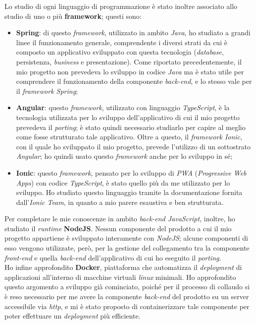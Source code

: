 Lo studio di ogni linguaggio di programmazione è stato inoltre associato allo studio di uno o più \textbf{framework}; questi sono:
\begin{itemize}
  \item \textbf{Spring}: di questo \textit{framework}, utilizzato in ambito \textit{Java}, ho studiato a grandi linee il funzionamento generale, comprendente i diversi strati da cui è composto un applicativo sviluppato con questa tecnologia (\textit{database}, persistenza, \textit{business} e presentazione). Come riportato precedentemente, il mio progetto non prevedeva lo sviluppo in codice \textit{Java} ma è stato utile per comprendere il funzionamento della componente \textit{back-end}, e lo stesso vale per il \textit{framework Spring};
  \item \textbf{Angular}: questo \textit{framework}, utilizzato con linguaggio \textit{TypeScript}, è la tecnologia utilizzata per lo sviluppo dell'applicativo di cui il mio progetto prevedeva il \textit{porting}; è stato quindi necessario studiarlo per capire al meglio come fosse strutturato tale applicativo. Oltre a questo, il \textit{framework Ionic}, con il quale ho sviluppato il mio progetto, prevede l'utilizzo di un sottostrato \textit{Angular}; ho quindi usato questo \textit{framework} anche per lo sviluppo in sé;
  \item \textbf{Ionic}: questo \textit{framework}, pensato per lo sviluppo di \textit{PWA} (\textit{Progressive Web Apps}) con codice \textit{TypeScript}, è stato quello più da me utilizzato per lo sviluppo. Ho studiato questo linguaggio tramite la documentazione fornita dall'\textit{Ionic Team}, in quanto a mio parere esaustiva e ben strutturata.
\end{itemize}

Per completare le mie conoscenze in ambito \textit{back-end JavaScript}, inoltre, ho studiato il \textit{runtime} \textbf{NodeJS}. Nessun componente del prodotto a cui il mio progetto appartiene è sviluppato interamente con \textit{NodeJS}; alcune componenti di esso vengono utilizzate, però, per la gestione del collegamento tra la componente \textit{front-end} e quella \textit{back-end} dell'applicativo di cui ho eseguito il \textit{porting}. \\
Ho infine approfondito \textbf{Docker}, piattaforma che automatizza il \textit{deployment} di applicazioni all'interno di macchine virtuali \textit{linux} minimali. Ho approfondito questo argomento a sviluppo già cominciato, poiché per il processo di collaudo si è reso necessario per me avere la componente \textit{back-end} del prodotto su un server accessibile via \textit{http}, e mi è stato proposto di containerizzare tale componente per poter effettuare un \textit{deployment} più efficiente.

